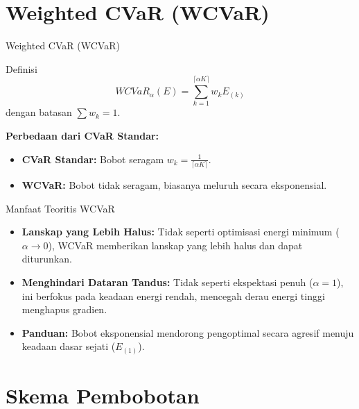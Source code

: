 \section{Weighted CVaR (WCVaR)}

\begin{frame}{Weighted CVaR (WCVaR)}
    \begin{block}{Definisi}
        \begin{equation}
            WCVaR_\alpha(E) = \sum_{k=1}^{\lceil \alpha K \rceil} w_k E_{(k)}
        \end{equation}
        dengan batasan $\sum w_k = 1$.
    \end{block}

    \textbf{Perbedaan dari CVaR Standar:}
    \begin{itemize}
        \item \textbf{CVaR Standar:} Bobot seragam $w_k = \frac{1}{\lceil \alpha K \rceil}$.
        \item \textbf{WCVaR:} Bobot tidak seragam, biasanya meluruh secara eksponensial.
    \end{itemize}
\end{frame}

\begin{frame}{Manfaat Teoritis WCVaR}
    \begin{itemize}
        \item \textbf{Lanskap yang Lebih Halus:} Tidak seperti optimisasi energi minimum ($\alpha \to 0$), WCVaR memberikan lanskap yang lebih halus dan dapat diturunkan.
        \item \textbf{Menghindari Dataran Tandus:} Tidak seperti ekspektasi penuh ($\alpha=1$), ini berfokus pada keadaan energi rendah, mencegah derau energi tinggi menghapus gradien.
        \item \textbf{Panduan:} Bobot eksponensial mendorong pengoptimal secara agresif menuju keadaan dasar sejati ($E_{(1)}$).
    \end{itemize}
\end{frame}

\section{Skema Pembobotan}

